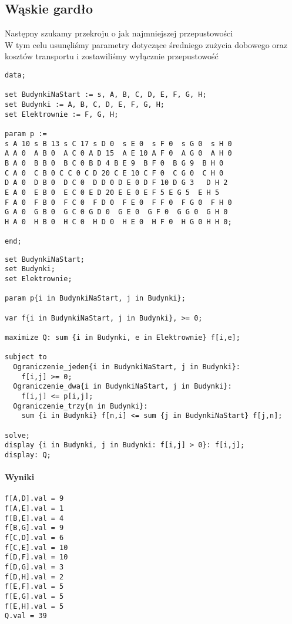 \documentclass[12pt]{article}
\begin{document}
\subsection{Wąskie gardło}
Następny szukamy przekroju o jak najmniejszej przepustowości \\
W tym celu usunęliśmy parametry dotyczące średniego zużycia dobowego oraz kosztów transportu i zostawiliśmy wyłącznie przepustowość
\begin{lstlisting}[caption= plik dat]
data; 
 
set BudynkiNaStart := s, A, B, C, D, E, F, G, H; 
set Budynki := A, B, C, D, E, F, G, H; 
set Elektrownie := F, G, H; 
 
param p := 
s A 10 s B 13 s C 17 s D 0  s E 0  s F 0  s G 0  s H 0
A A 0  A B 0  A C 0 A D 15  A E 10 A F 0  A G 0  A H 0
B A 0  B B 0  B C 0 B D 4 B E 9  B F 0  B G 9  B H 0
C A 0  C B 0 C C 0 C D 20 C E 10 C F 0  C G 0  C H 0   
D A 0  D B 0  D C 0  D D 0 D E 0 D F 10 D G 3   D H 2 
E A 0  E B 0  E C 0 E D 20 E E 0 E F 5 E G 5  E H 5  
F A 0  F B 0  F C 0  F D 0  F E 0  F F 0  F G 0  F H 0
G A 0  G B 0  G C 0 G D 0  G E 0  G F 0  G G 0  G H 0
H A 0  H B 0  H C 0  H D 0  H E 0  H F 0  H G 0 H H 0; 
 
end; 
\end{lstlisting}
\begin{lstlisting}[caption= plik mod]
set BudynkiNaStart; 
set Budynki; 
set Elektrownie; 
 
param p{i in BudynkiNaStart, j in Budynki}; 
 
var f{i in BudynkiNaStart, j in Budynki}, >= 0; 
 
maximize Q: sum {i in Budynki, e in Elektrownie} f[i,e]; 
 
subject to 
  Ograniczenie_jeden{i in BudynkiNaStart, j in Budynki}: 
    f[i,j] >= 0; 
  Ograniczenie_dwa{i in BudynkiNaStart, j in Budynki}: 
    f[i,j] <= p[i,j]; 
  Ograniczenie_trzy{n in Budynki}: 
    sum {i in Budynki} f[n,i] <= sum {j in BudynkiNaStart} f[j,n]; 
 
solve; 
display {i in Budynki, j in Budynki: f[i,j] > 0}: f[i,j]; 
display: Q;
\end{lstlisting}

\paragraph{Wyniki}
\begin{lstlisting}[caption=Wynik z glpk]
f[A,D].val = 9
f[A,E].val = 1
f[B,E].val = 4
f[B,G].val = 9
f[C,D].val = 6
f[C,E].val = 10
f[D,F].val = 10
f[D,G].val = 3
f[D,H].val = 2
f[E,F].val = 5
f[E,G].val = 5
f[E,H].val = 5
Q.val = 39
\end{lstlisting}
\end{document}
